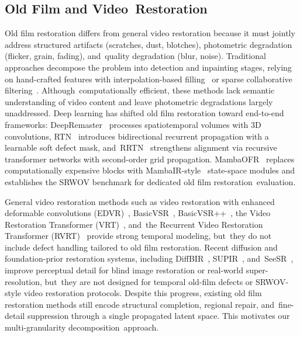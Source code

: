 \documentclass[symmetry,article,accept,pdftex,moreauthors]{Definitions/mdpi}
\begin{document}
\subsection{Old Film and Video~Restoration}
\label{subsec:ofr}

Old film restoration differs from general video restoration because it must jointly address structured artifacts (scratches, dust, blotches), photometric degradation (flicker, grain, fading), and~quality degradation (blur, noise). Traditional approaches decompose the problem into detection and inpainting stages, relying on hand-crafted features with interpolation-based filling~\cite{kokaram2004missing} or sparse collaborative filtering~\cite{dabov2007bm3d,he2013guided}. Although~computationally efficient, these methods lack semantic understanding of video content and leave photometric degradations largely unaddressed. Deep learning has shifted old film restoration toward end-to-end frameworks: DeepRemaster~\cite{iizuka2019deepremaster} processes spatiotemporal volumes with 3D convolutions, RTN~\cite{wan2022rtn} introduces bidirectional recurrent propagation with a learnable soft defect mask, and~RRTN~\cite{lin2024rrtn} strengthens alignment via recursive transformer networks with second-order grid propagation. MambaOFR~\cite{mao2025mambaofr} replaces computationally expensive blocks with MambaIR-style~\cite{guo2024mambair} state-space modules and establishes the SRWOV benchmark for dedicated old film restoration~evaluation.

General video restoration methods such as video restoration with enhanced deformable convolutions (EDVR)~\cite{wang2019edvr}, BasicVSR~\cite{chan2021basicvsr}, BasicVSR++~\cite{chan2022basicvsrpp}, the Video Restoration Transformer (VRT)~\cite{liang2024vrt}, and~the Recurrent Video Restoration Transformer (RVRT)~\cite{liang2022rvrt} provide strong temporal modeling, but~they do not include defect handling tailored to old film restoration. Recent diffusion and foundation-prior restoration systems, including DiffBIR~\cite{lin2024diffbir}, SUPIR~\cite{yu2024supir}, and~SeeSR~\cite{wu2024seesr}, improve perceptual detail for blind image restoration or real-world super-resolution, but~they are not designed for temporal old-film defects or SRWOV-style video restoration protocols. Despite this progress, existing old film restoration methods still encode structural completion, regional repair, and~fine-detail suppression through a single propagated latent space. This motivates our multi-granularity decomposition~approach.
\end{document}
